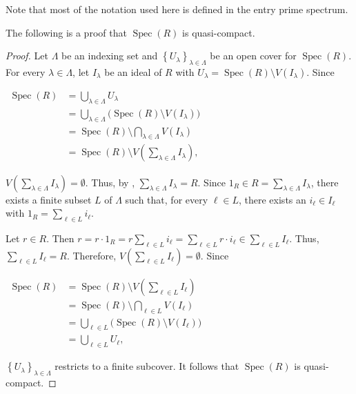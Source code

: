 \documentclass[12pt]{article}
\begin{document}
Note that most of the notation used here is defined in the entry prime spectrum.

The following is a proof that $\operatorname{Spec}(R)$ is quasi-compact.

\begin{proof}
Let $\Lambda$ be an indexing set and $\displaystyle \left\{ U_{\lambda} \right\}_{\lambda \in \Lambda}$ be an open cover for $\operatorname{Spec}(R)$.  For every $\lambda \in \Lambda$, let $I_{\lambda}$ be an ideal of $R$ with $\displaystyle U_{\lambda}=\operatorname{Spec}(R) \setminus V\left( I_{\lambda} \right)$.  Since

\begin{center}
$\begin{array}{ll}
\operatorname{Spec}(R) & \displaystyle =\bigcup_{\lambda \in \Lambda} U_{\lambda} \\
& \displaystyle =\bigcup_{\lambda \in \Lambda} \bigg( \operatorname{Spec}(R) \setminus V\left( I_{\lambda} \right) \bigg) \\
& \displaystyle =\operatorname{Spec}(R) \setminus \bigcap_{\lambda \in \Lambda} V\left( I_{\lambda} \right) \\
& \displaystyle =\operatorname{Spec}(R) \setminus V\left( \sum_{\lambda \in \Lambda} I_{\lambda} \right), \end{array}$
\end{center}

$\displaystyle V\left( \sum_{\lambda \in \Lambda} I_{\lambda} \right)=\emptyset$.  Thus, by , $\displaystyle \sum_{\lambda \in \Lambda} I_{\lambda} =R$.  Since $\displaystyle 1_R \in R=\sum_{\lambda \in \Lambda} I_{\lambda}$, there exists a finite subset $L$ of $\Lambda$ such that, for every $\ell \in L$, there exists an $i_{\ell} \in I_{\ell}$ with $\displaystyle 1_R=\sum_{\ell \in L} i_{\ell}$.

Let $r \in R$.  Then $\displaystyle r=r \cdot 1_R=r\sum_{\ell \in L} i_{\ell}=\sum_{\ell \in L} r \cdot i_{\ell} \in \sum_{\ell \in L} I_{\ell}$.  Thus, $\displaystyle \sum_{\ell \in L} I_{\ell}=R$.  Therefore, $\displaystyle V\left( \sum_{\ell \in L} I_{\ell} \right)=\emptyset$.  Since

\begin{center}
$\begin{array}{ll}
\operatorname{Spec}(R) & \displaystyle =\operatorname{Spec}(R) \setminus V\left( \sum_{\ell \in L} I_{\ell} \right) \\
& \displaystyle =\operatorname{Spec}(R) \setminus \bigcap_{\ell \in L} V\left( I_{\ell} \right) \\
& \displaystyle =\bigcup_{\ell \in L} \bigg( \operatorname{Spec}(R) \setminus V\left( I_{\ell} \right) \bigg) \\
& \displaystyle =\bigcup_{\ell \in L} U_{\ell}, \end{array}$
\end{center}

$\displaystyle \left\{ U_{\lambda} \right\}_{\lambda \in \Lambda}$ restricts to a finite subcover.  It follows that $\operatorname{Spec}(R)$ is quasi-compact.
\end{proof}
\end{document}

